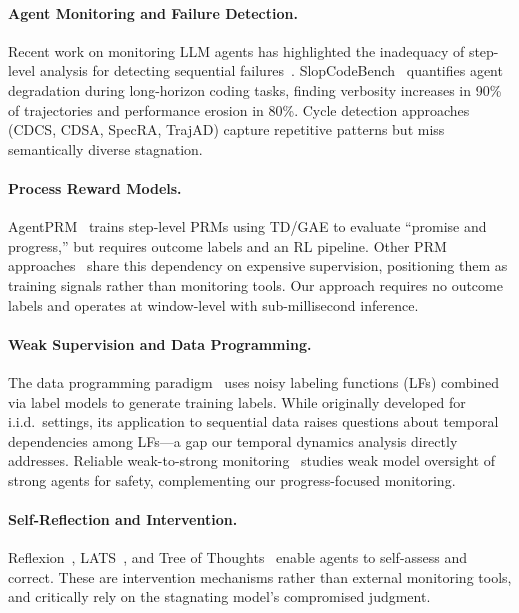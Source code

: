 \documentclass[11pt,a4paper]{article}
\begin{document}
\paragraph{Agent Monitoring and Failure Detection.}
Recent work on monitoring LLM agents has highlighted the inadequacy of step-level analysis for detecting sequential failures~\cite{iclr2025monitoring}.
SlopCodeBench~\cite{slopcodebench2026} quantifies agent degradation during long-horizon coding tasks, finding verbosity increases in 90\% of trajectories and performance erosion in 80\%.
Cycle detection approaches (CDCS, CDSA, SpecRA, TrajAD) capture repetitive patterns but miss semantically diverse stagnation.

\paragraph{Process Reward Models.}
AgentPRM~\cite{xie2026agentprm} trains step-level PRMs using TD/GAE to evaluate ``promise and progress,'' but requires outcome labels and an RL pipeline.
Other PRM approaches~\cite{prm_framework2025, toolprmbench2026, traj_reward2026} share this dependency on expensive supervision, positioning them as training signals rather than monitoring tools.
Our approach requires no outcome labels and operates at window-level with sub-millisecond inference.

\paragraph{Weak Supervision and Data Programming.}
The data programming paradigm~\cite{ratner2016data} uses noisy labeling functions (LFs) combined via label models to generate training labels.
While originally developed for i.i.d.\ settings, its application to sequential data raises questions about temporal dependencies among LFs---a gap our temporal dynamics analysis directly addresses.
Reliable weak-to-strong monitoring~\cite{weak2strong2025} studies weak model oversight of strong agents for safety, complementing our progress-focused monitoring.

\paragraph{Self-Reflection and Intervention.}
Reflexion~\cite{shinn2023reflexion}, LATS~\cite{zhou2024lats}, and Tree of Thoughts~\cite{yao2024tree} enable agents to self-assess and correct.
These are intervention mechanisms rather than external monitoring tools, and critically rely on the stagnating model's compromised judgment.
\end{document}
